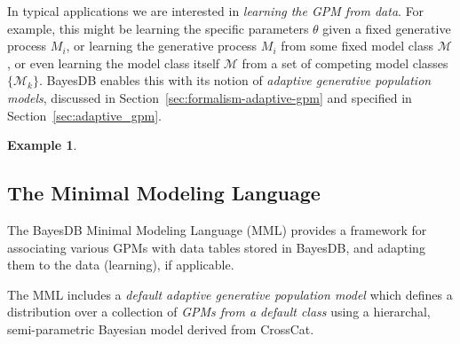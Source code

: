 \documentclass[10pt,letterpaper]{article}
\newtheorem{example}{Example}[section]
\newcommand{\set}[1]{\{#1\}}
\begin{document}

In typical applications we are interested in \textit{learning the GPM
  from data}. For example, this might be learning the specific
parameters $\theta$ given a fixed generative process $M_i$, or
learning the generative process $M_i$ from some fixed model class
$\mathcal{M}$, or even learning the model class itself $\mathcal{M}$
from a set of competing model classes $\set{\mathcal{M}_k}$.  BayesDB
enables this with its notion of \emph{adaptive generative population
  models}, discussed in Section~\ref{sec:formalism-adaptive-gpm} and
specified in Section~\ref{sec:adaptive_gpm}.

\begin{example}
\end{example}

\subsection{The Minimal Modeling Language}
\label{sec:mml}

The BayesDB Minimal Modeling Language (MML) provides a framework for
associating various GPMs with data tables stored in BayesDB, and
adapting them to the data (learning), if applicable.

The MML includes a \textit{default adaptive generative population
  model} which defines a distribution over a collection of
\textit{GPMs from a default class} using a hierarchal, semi-parametric
Bayesian model derived from CrossCat.
\end{document}
